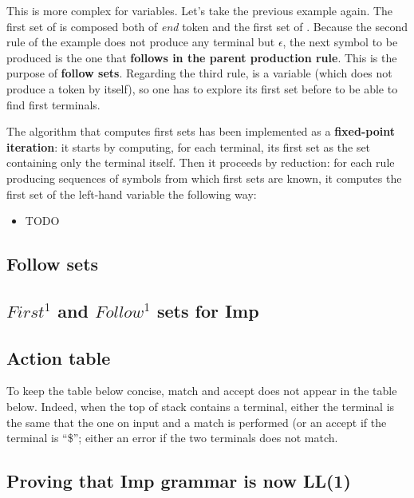 This is more complex for variables. Let's take the previous example again. The first set of 
is composed both of \textit{end} token and the first set of . Because the second rule of the example
does not produce any terminal but $\epsilon$, the next symbol to be produced is the one that \textbf{follows in the parent production rule}.
This is the purpose of \textbf{follow sets}.
Regarding the third rule,  is a variable (which does not produce a token by itself), so one has to explore its first set
before to be able to find first terminals.

The algorithm that computes first sets has been implemented as a \textbf{fixed-point iteration}: it starts by computing, for each terminal, 
its first set as the set containing only the terminal itself. Then it proceeds by reduction: for each rule producing sequences of symbols
from which first sets are known, it computes the first set of the left-hand variable the following way:
\begin{itemize}
  \item TODO
\end{itemize}

\subsection{Follow sets}

\subsection{$First^1$ and $Follow^1$ sets for Imp}

    {\small\ttfamily
      
    }

\subsection{Action table}

To keep the table below concise, match and accept does not appear in the table below. Indeed, when the top of stack
contains a terminal, either the terminal is the same that the one on input and a match is performed (or an accept if the
terminal is ``\$''; either an error if the two terminals does not match.

{\small\ttfamily
  
}

\subsection{Proving that Imp grammar is now LL(1)}
